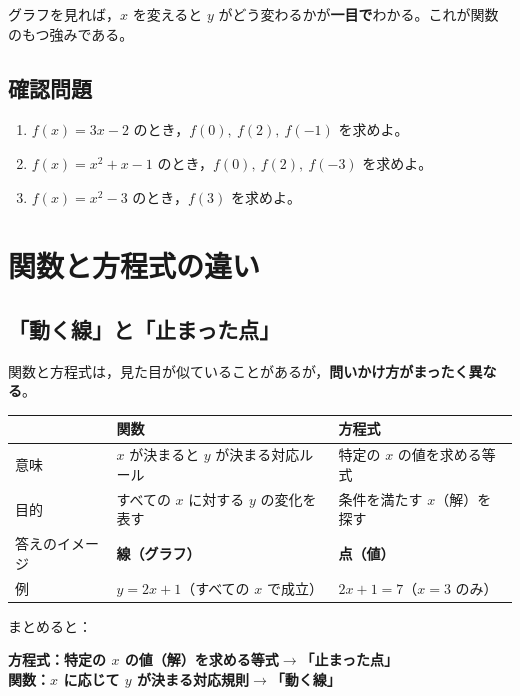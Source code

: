 \documentclass[paper=a4,fleqn]{jlreq}
\begin{document}
グラフを見れば，\(x\) を変えると \(y\) がどう変わるかが\textbf{一目で}わかる。これが関数のもつ強みである。

\subsection{確認問題}
\begin{enumerate}
  \item \(f(x) = 3x - 2\) のとき，\(f(0),\ f(2),\ f(-1)\) を求めよ。
  \item \(f(x) = x^2 + x - 1\) のとき，\(f(0),\ f(2),\ f(-3)\) を求めよ。
  \item \(f(x) = x^2 - 3\) のとき，\(f(3)\) を求めよ。
\end{enumerate}

\newpage
\section{関数と方程式の違い}

\subsection{「動く線」と「止まった点」}

関数と方程式は，見た目が似ていることがあるが，\textbf{問いかけ方がまったく異なる}。

\vspace{8pt}
\begin{center}
\renewcommand{\arraystretch}{1.6}
\begin{tabular}{p{4cm}|p{5cm}|p{4.5cm}}
\hline
& \textbf{関数} & \textbf{方程式} \\
\hline
意味 & \(x\) が決まると \(y\) が決まる対応ルール & 特定の \(x\) の値を求める等式 \\
目的 & すべての \(x\) に対する \(y\) の変化を表す & 条件を満たす \(x\)（解）を探す \\
答えのイメージ & \textbf{線（グラフ）} & \textbf{点（値）} \\
例 & \(y = 2x + 1\)（すべての \(x\) で成立） & \(2x + 1 = 7\)（\(x = 3\) のみ） \\
\hline
\end{tabular}
\end{center}

\vspace{8pt}
まとめると：

\vspace{4pt}
\begin{center}
{\large\bfseries\boldmath
  \textbf{方程式}：特定の \(x\) の値（解）を求める等式\quad $\rightarrow$\quad 「止まった点」\\[6pt]
  \textbf{関数}：\(x\) に応じて \(y\) が決まる対応規則\quad $\rightarrow$\quad 「動く線」
}
\end{center}
\vspace{4pt}
\end{document}
